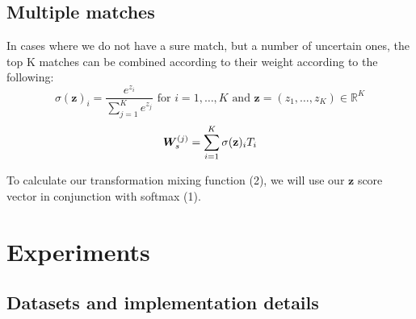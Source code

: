 \documentclass{article} %
\begin{document}

\subsection{Multiple matches} %

In cases where we do not have a sure match, but a number of uncertain ones, the top K matches can be combined according to their weight according to the following:
%
\begin{equation}
\sigma (\mathbf {z} )_{i}={\frac {e^{z_{i}}}{\sum _{j=1}^{K}e^{z_{j}}}}{\text{ for }}i=1,\dotsc ,K{\text{ and }}\mathbf {z} =(z_{1},\dotsc ,z_{K})\in \mathbb {R} ^{K}
\end{equation}
%
\begin{equation}
	{\bm{W}}_s^{(j)} = \sum _{i=1}^{K} \sigma (\mathbf {z} )_{i} T_i
\end{equation}

To calculate our transformation mixing function (2), we will use our $\mathbf{z}$ score vector in conjunction with softmax (1).


\section{Experiments}

\subsection{Datasets and implementation details}
\end{document}
